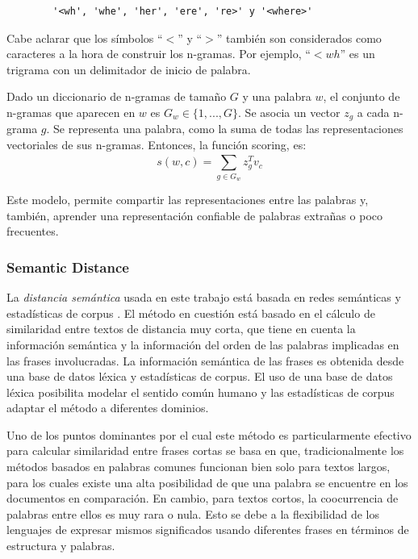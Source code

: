 \begin{center}\ttfamily{}%
	\begin{minipage}{45\wd0}%
		\begin{verbatim}
		'<wh', 'whe', 'her', 'ere', 're>' y '<where>'
		\end{verbatim}
	\end{minipage}
\end{center}

Cabe aclarar que los símbolos ``\(<\)'' y ``\(>\)'' también son considerados como caracteres a la hora de construir los n-gramas. Por ejemplo, ``\(<wh\)'' es un trigrama con un delimitador de inicio de palabra.

\bigskip Dado un diccionario de n-gramas de tamaño \(G\) y una palabra \(w\), el conjunto de n-gramas que aparecen en \(w\) es \(G_w \in \{1,..., G\}\). Se asocia un vector \(z_g\) a cada n-grama \(g\). Se representa una palabra, como la suma de todas las representaciones vectoriales de sus n-gramas. Entonces, la función scoring, es:
\[s(w,c) = \sum_{g \in G_w}^{}{}z_g^T v_c\]

Este modelo, permite compartir las representaciones entre las palabras y, también, aprender una representación confiable de palabras extrañas o poco frecuentes.

\subsubsection{Semantic Distance}
La \textit{distancia semántica} usada en este trabajo está basada en redes semánticas y estadísticas de corpus \citep{li2006sentence}. El método en cuestión está basado en el cálculo de similaridad entre textos de distancia muy corta, que tiene en cuenta la información semántica y la información del orden de las palabras implicadas en las frases involucradas. La información semántica de las frases es obtenida desde una base de datos léxica y estadísticas de corpus. El uso de una base de datos léxica posibilita modelar el sentido común humano y las estadísticas de corpus adaptar el método a diferentes dominios.

\bigskip Uno de los puntos dominantes por el cual este método es particularmente efectivo para calcular similaridad entre frases cortas se basa en que, tradicionalmente los métodos basados en palabras comunes funcionan bien solo para textos largos, para los cuales existe una alta posibilidad de que una palabra se encuentre en los documentos en comparación. En cambio, para textos cortos, la coocurrencia de palabras entre ellos es muy rara o nula. Esto se debe a la flexibilidad de los lenguajes de expresar mismos significados usando diferentes frases en términos de estructura y palabras.

